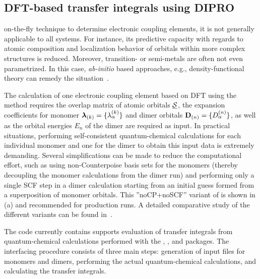 \subsection{DFT-based transfer integrals using DIPRO}
\label{sec:dft}
on-the-fly technique to determine electronic coupling elements, it is not 
generally applicable to all systems. For instance, its predictive capacity with 
regards to atomic composition and localization behavior of orbitals within more 
complex structures is reduced. Moreover, transition- or semi-metals are often 
not even parametrized. In this case, {\it ab-initio} based approaches, e.g., 
density-functional theory can remedy the 
situation~\cite{huang_intermolecular_2004,huang_validation_2005,
valeev_effect_2006,yin_balanced_2006,yang_theoretical_2007,
baumeier_density-functional_2010}. 

The calculation of one electronic coupling element based on DFT using the \dipro 
method requires the overlap matrix of atomic orbitals $\underline{\mathbf{\mathcal{S}}}$, the 
expansion coefficients for monomer ${\mathbf{\boldsymbol{\lambda}}}_{(k)} = \{ 
\lambda_\alpha^{(k)}\}$ and dimer orbitals ${\mathbf{D}}_{(n)} = \{ D^{(n)}_{\alpha} 
\}$, as well as the orbital energies $E_{n}$ of the dimer are required as input. 
In practical situations, performing self-consistent quantum-chemical 
calculations for each individual monomer and one for the dimer to obtain this 
input data is extremely demanding. Several simplifications can be made to reduce 
the computational effort, such as using non-Counterpoise basis sets for the 
monomers (thereby decoupling the monomer calculations from the dimer run) and 
performing only a single SCF step in a dimer calculation starting from an 
initial guess formed from a superposition of monomer orbitals. This 
''noCP+noSCF'' variant of \dipro is shown in (a) and 
recommended for production runs. 
A detailed comparative study of the different variants can be found 
in~\cite{baumeier_density-functional_2010}.

The code currently contains supports evaluation of transfer integrals from 
quantum-chemical calculations performed with the \gaussian, \orca, and 
\nwchem packages. The interfacing procedure consists of three main steps: 
generation of input files for monomers and dimers, performing the actual 
quantum-chemical calculations, and calculating the transfer integrals. 

